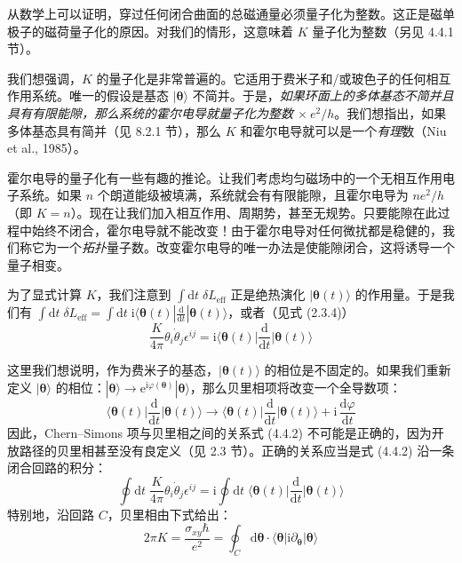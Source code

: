 从数学上可以证明，穿过任何闭合曲面的总磁通量必须量子化为整数。这正是磁单极子的磁荷量子化的原因。对我们的情形，这意味着 $K$ 量子化为整数（另见 4.4.1 节）。

我们想强调，$K$ 的量子化是非常普遍的。它适用于费米子和/或玻色子的任何相互作用系统。唯一的假设是基态 $|\pmb{\theta}\rangle$ 不简并。于是，\emph{如果环面上的多体基态不简并且具有有限能隙，那么系统的霍尔电导就量子化为整数 $\times\ e^{2}/h$}。我们想指出，如果多体基态具有简并（见 8.2.1 节），那么 $K$ 和霍尔电导就可以是一个\emph{有理}数（Niu et al., 1985）。

霍尔电导的量子化有一些有趣的推论。让我们考虑均匀磁场中的一个无相互作用电子系统。如果 $n$ 个朗道能级被填满，系统就会有有限能隙，且霍尔电导为 $ne^{2}/h$（即 $K = n$）。现在让我们加入相互作用、周期势，甚至无规势。只要能隙在此过程中始终不闭合，霍尔电导就不能改变！由于霍尔电导对任何微扰都是稳健的，我们称它为一个\emph{拓扑}量子数。改变霍尔电导的唯一办法是使能隙闭合，这将诱导一个量子相变。

为了显式计算 $K$，我们注意到 $\int \mathrm{d}t\; \delta L_{\mathrm{eff}}$ 正是绝热演化 $|\pmb{\theta}(t)\rangle$ 的作用量。于是我们有 $\int \mathrm{d}t\; \delta L_{\mathrm{eff}} = \int \mathrm{d}t\; \mathrm{i}\langle \pmb{\theta}(t) | \frac{\mathrm{d}}{\mathrm{d}t} | \pmb{\theta}(t) \rangle$，或者（见式 (2.3.4)）
\begin{equation*}
\frac{K}{4\pi} \theta_{i} \dot{\theta}_{j} \epsilon^{ij} = \mathrm{i} \Big\langle \pmb{\theta}(t) \Big| \frac{\mathrm{d}}{\mathrm{d}t} \Big| \pmb{\theta}(t) \Big\rangle \tag{4.4.2}
\end{equation*}

这里我们想说明，作为费米子的基态，$|\pmb{\theta}(t)\rangle$ 的相位是不固定的。如果我们重新定义 $|\pmb{\theta}\rangle$ 的相位：$|\pmb{\theta}\rangle \to \mathrm{e}^{\mathrm{i}\varphi(\pmb{\theta})} |\pmb{\theta}\rangle$，那么贝里相项将改变一个全导数项：
\begin{equation*}
\Big\langle \pmb{\theta}(t) \Big| \frac{\mathrm{d}}{\mathrm{d}t} \Big| \pmb{\theta}(t) \Big\rangle \to \Big\langle \pmb{\theta}(t) \Big| \frac{\mathrm{d}}{\mathrm{d}t} \Big| \pmb{\theta}(t) \Big\rangle + \mathrm{i}\, \frac{\mathrm{d}\varphi}{\mathrm{d}t}
\end{equation*}
因此，Chern--Simons 项与贝里相之间的关系式 (4.4.2) 不可能是正确的，因为开放路径的贝里相甚至没有良定义（见 2.3 节）。正确的关系应当是式 (4.4.2) 沿一条闭合回路的积分：
\begin{equation*}
\oint \mathrm{d}t\; \frac{K}{4\pi} \theta_{i} \dot{\theta}_{j} \epsilon^{ij} = \mathrm{i} \oint \mathrm{d}t\; \Big\langle \pmb{\theta}(t) \Big| \frac{\mathrm{d}}{\mathrm{d}t} \Big| \pmb{\theta}(t) \Big\rangle
\end{equation*}
特别地，沿回路 $C$，贝里相由下式给出：
\begin{equation*}
2\pi K = \frac{\sigma_{xy} \hbar}{e^{2}} = \oint_{C} \mathrm{d}\pmb{\theta} \cdot \langle \pmb{\theta} | \mathrm{i} \partial_{\pmb{\theta}} | \pmb{\theta} \rangle \tag{4.4.3}
\end{equation*}

